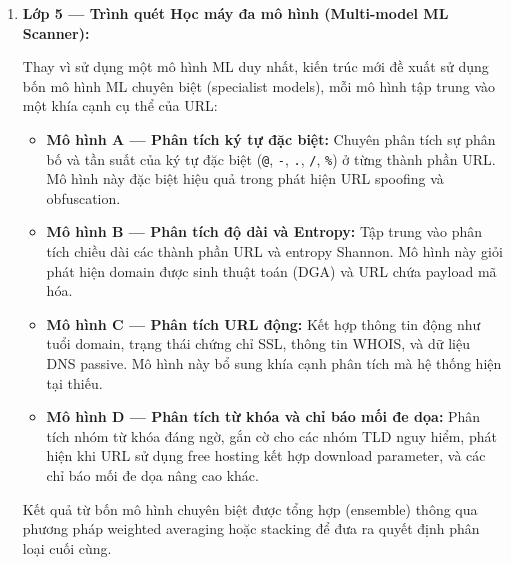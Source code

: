 \documentclass[a4paper,12pt]{article}
\begin{document}
\begin{enumerate}
    \item \textbf{Lớp 5 --- Trình quét Học máy đa mô hình (Multi-model ML Scanner):}

    Thay vì sử dụng một mô hình ML duy nhất, kiến trúc mới đề xuất sử dụng bốn mô hình ML chuyên biệt (specialist models), mỗi mô hình tập trung vào một khía cạnh cụ thể của URL:

    \begin{itemize}
        \item \textbf{Mô hình A --- Phân tích ký tự đặc biệt:} Chuyên phân tích sự phân bố và tần suất của ký tự đặc biệt (\texttt{@}, \texttt{-}, \texttt{.}, \texttt{/}, \texttt{\%}) ở từng thành phần URL. Mô hình này đặc biệt hiệu quả trong phát hiện URL spoofing và obfuscation.

        \item \textbf{Mô hình B --- Phân tích độ dài và Entropy:} Tập trung vào phân tích chiều dài các thành phần URL và entropy Shannon. Mô hình này giỏi phát hiện domain được sinh thuật toán (DGA) và URL chứa payload mã hóa.

        \item \textbf{Mô hình C --- Phân tích URL động:} Kết hợp thông tin động như tuổi domain, trạng thái chứng chỉ SSL, thông tin WHOIS, và dữ liệu DNS passive. Mô hình này bổ sung khía cạnh phân tích mà hệ thống hiện tại thiếu.

        \item \textbf{Mô hình D --- Phân tích từ khóa và chỉ báo mối đe dọa:} Phân tích nhóm từ khóa đáng ngờ, gắn cờ cho các nhóm TLD nguy hiểm, phát hiện khi URL sử dụng free hosting kết hợp download parameter, và các chỉ báo mối đe dọa nâng cao khác.
    \end{itemize}

    Kết quả từ bốn mô hình chuyên biệt được tổng hợp (ensemble) thông qua phương pháp weighted averaging hoặc stacking để đưa ra quyết định phân loại cuối cùng.
\end{enumerate}
\end{document}
